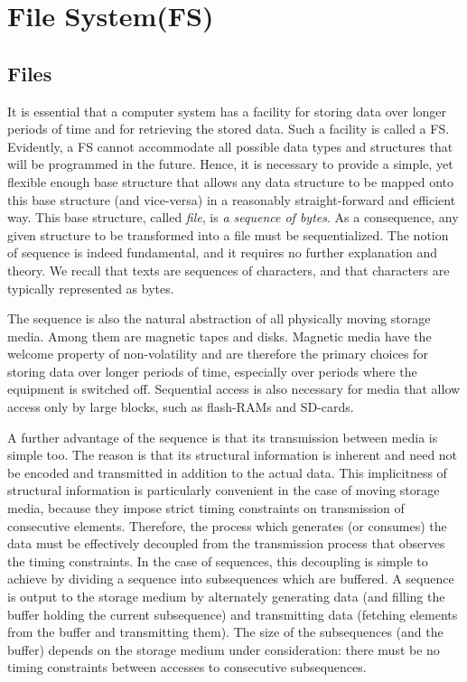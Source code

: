 \chapter{File System(FS)}
\label{ch:FS}
\section{Files}
It is essential that a computer system has a facility for storing data over longer periods of time
and for retrieving the stored data. Such a facility is called a FS. Evidently, a FS cannot accommodate
all possible data types and structures that will be programmed in the future.  Hence, it is necessary
to provide a simple, yet flexible enough base structure that allows any data structure to be mapped
onto this base structure (and vice-versa) in a reasonably straight-forward and efficient way. This base
structure, called \emph{file}, is \emph{a sequence of bytes}. As a consequence, any given structure to
be transformed into a file must be sequentialized. The notion of sequence is indeed fundamental, and it
requires no further explanation and theory. We recall that texts are sequences of characters, and that
characters are typically represented as bytes.

The sequence is also the natural abstraction of all physically moving storage media. Among them
are magnetic tapes and disks. Magnetic media have the welcome property of non-volatility and
are therefore the primary choices for storing data over longer periods of time, especially over
periods where the equipment is switched off. Sequential access is also necessary for media that
allow access only by large blocks, such as flash-RAMs and SD-cards.

A further advantage of the sequence is that its transmission between media is simple too. The
reason is that its structural information is inherent and need not be encoded and transmitted in
addition to the actual data. This implicitness of structural information is particularly convenient in
the case of moving storage media, because they impose strict timing constraints on transmission
of consecutive elements. Therefore, the process which generates (or consumes) the data must
be effectively decoupled from the transmission process that observes the timing constraints. In
the case of sequences, this decoupling is simple to achieve by dividing a sequence into
subsequences which are buffered. A sequence is output to the storage medium by alternately
generating data (and filling the buffer holding the current subsequence) and transmitting data
(fetching elements from the buffer and transmitting them). The size of the subsequences (and the
buffer) depends on the storage medium under consideration: there must be no timing constraints
between accesses to consecutive subsequences.

